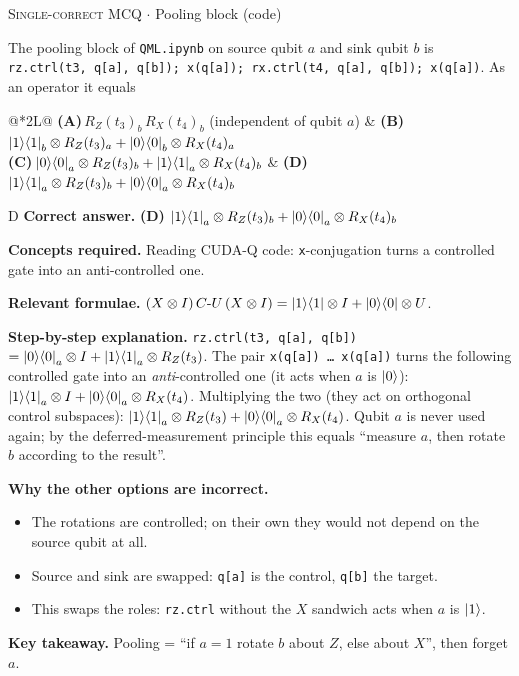 \documentclass[11pt,a4paper]{article}
\newcommand{\optlabel}[1]{\textbf{(#1)}}
\newcommand{\correctlabel}[1]{\textcolor{okgreen}{\textbf{(#1)}\,\ding{51}}}
\newenvironment{qitem}[1]{\begin{list}{}{\setlength{\leftmargin}{3.3em}\setlength{\labelwidth}{3.1em}%
  \setlength{\labelsep}{0.2em}\setlength{\topsep}{3pt}\setlength{\parsep}{3pt}}\item[\textbf{Q.#1}\hfill]}{\end{list}}
\newcommand{\qsep}{\par\vspace{2pt}{\color{black!15}\hrule}\vspace{4pt}}
\newcommand{\qmeta}[2]{{\footnotesize\color{black!60}\textsc{#1} \;$\cdot$\; #2}\par}
\begin{document}
\begin{qitem}{50}
\qmeta{Single-correct MCQ}{Pooling block (code)}
The pooling block of \texttt{QML.ipynb} on source qubit $a$ and sink qubit $b$ is
\texttt{rz.ctrl(t3, q[a], q[b]); x(q[a]); rx.ctrl(t4, q[a], q[b]); x(q[a])}. As an operator it equals
\par\smallskip\noindent\begin{tabularx}{\linewidth}{@{}*{2}{L}@{}}
\optlabel{A}\,$R_Z(t_3)_b\,R_X(t_4)_b$ (independent of qubit $a$) & \optlabel{B}\,$\ket1\!\bra1_b\otimes R_Z(t_3)_a + \ket0\!\bra0_b\otimes R_X(t_4)_a$ \\[3pt]
\optlabel{C}\,$\ket0\!\bra0_a\otimes R_Z(t_3)_b + \ket1\!\bra1_a\otimes R_X(t_4)_b$ & \correctlabel{D}\,$\ket1\!\bra1_a\otimes R_Z(t_3)_b + \ket0\!\bra0_a\otimes R_X(t_4)_b$
\end{tabularx}
\end{qitem}
\begin{solbox}{D}
\textbf{\color{brand}Correct answer.} \textcolor{okgreen}{\textbf{(D)}} $\ket1\!\bra1_a\otimes R_Z(t_3)_b + \ket0\!\bra0_a\otimes R_X(t_4)_b$

\textbf{\color{brand}Concepts required.} Reading CUDA-Q code: \texttt{x}-conjugation turns a controlled gate into an anti-controlled one.

\textbf{\color{brand}Relevant formulae.} $(X\otimes I)\,C\text{-}U\,(X\otimes I) = \ket1\!\bra1\otimes I + \ket0\!\bra0\otimes U$.

\textbf{\color{brand}Step-by-step explanation.} \texttt{rz.ctrl(t3, q[a], q[b])} $= \ket0\!\bra0_a\otimes I + \ket1\!\bra1_a\otimes R_Z(t_3)$. The pair \texttt{x(q[a]) \dots\ x(q[a])}
turns the following controlled gate into an \emph{anti}-controlled one (it acts when $a$ is $\ket0$):
$\ket1\!\bra1_a\otimes I + \ket0\!\bra0_a\otimes R_X(t_4)$. Multiplying the two (they act on orthogonal control subspaces):
$\ket1\!\bra1_a\otimes R_Z(t_3) + \ket0\!\bra0_a\otimes R_X(t_4)$. Qubit $a$ is never used again; by the deferred-measurement
principle this equals ``measure $a$, then rotate $b$ according to the result''.

\textbf{\color{brand}Why the other options are incorrect.}
\begin{itemize}[leftmargin=2.4em, itemsep=1pt, topsep=2pt]
\item[\textbf{(A)}] The rotations are controlled; on their own they would not depend on the source qubit at all.
\item[\textbf{(B)}] Source and sink are swapped: \texttt{q[a]} is the control, \texttt{q[b]} the target.
\item[\textbf{(C)}] This swaps the roles: \texttt{rz.ctrl} without the $X$ sandwich acts when $a$ is $\ket1$.
\end{itemize}
\textbf{\color{brand}Key takeaway.} Pooling = ``if $a = 1$ rotate $b$ about $Z$, else about $X$'', then forget $a$.
\end{solbox}
\qsep
\end{document}
